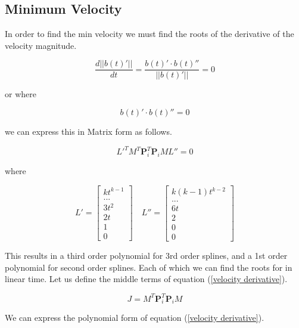 \documentclass{article}
\begin{document}
\subsection{Minimum Velocity}

In order to find the min velocity we must find the roots of the derivative of the velocity magnitude.

\begin{equation}
    \frac{d ||b(t)'||}{dt} = \frac{b(t)' \cdot b(t)''}{||b(t)'||} = 0
\end{equation}

or where

\begin{equation} \label{eq:roots of velocity derivative}
    b(t)' \cdot b(t)'' = 0
\end{equation}

we can express this in Matrix form as follows.

\begin{equation} \label{velocity derivative}
    L'^T M^{T}\textbf{P}_i^{T}\textbf{P}_iML'' = 0
\end{equation}

where 

\begin{equation}
    L'=\begin{bmatrix} kt^{k-1} \\ ... \\ 3t^2 \\ 2t \\ 1 \\ 0 \end{bmatrix} \quad L''=\begin{bmatrix} k(k-1)t^{k-2} \\ ... \\ 6t \\ 2 \\ 0 \\ 0 \end{bmatrix}
\end{equation}

This results in a third order polynomial for 3rd order splines, and a 1st order polynomial for second order splines. Each of which we can find the roots for in linear time. Let us define the middle terms of equation (\ref{velocity derivative}).

\begin{equation}
    J = M^{T}\textbf{P}_i^{T}\textbf{P}_iM
\end{equation}

We can express the polynomial form of equation (\ref{velocity derivative}). 
\end{document}
